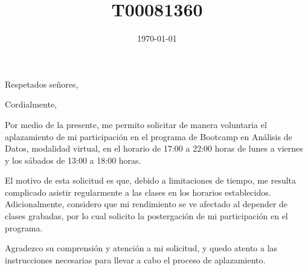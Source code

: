 \documentclass[11pt, letterpaper, roman]{moderncv}
\title{T00081360}
\begin{document}
\date{\today}
\opening{Respetados señores,}
\closing{Cordialmente,}

\makelettertitle{}

Por medio de la presente, me permito solicitar de manera voluntaria el
aplazamiento de mi participación en el programa de Bootcamp en Análisis de
Datos, modalidad virtual, en el horario de 17:00 a 22:00 horas de lunes a
viernes y los sábados de 13:00 a 18:00 horas.

El motivo de esta solicitud es que, debido a limitaciones de tiempo, me resulta
complicado asistir regularmente a las clases en los horarios establecidos.
Adicionalmente, considero que mi rendimiento se ve afectado al depender de
clases grabadas, por lo cual solicito la postergación de mi participación en el
programa.

Agradezco su comprensión y atención a mi solicitud, y quedo atento a las
instrucciones necesarias para llevar a cabo el proceso de aplazamiento.

\makeletterclosing{}
\end{document}
